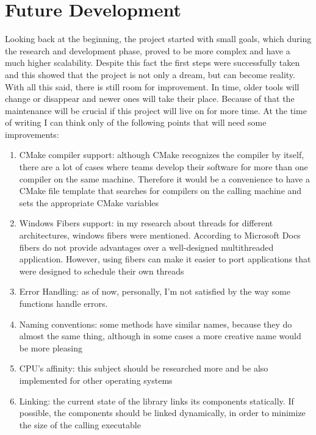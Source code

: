 \chapter{Future Development}
Looking back at the beginning, the project started with small goals, which during the research and development phase, proved to be more complex and have a much higher scalability. Despite this fact the first steps were successfully taken and this showed that the project is not only a dream, but can become reality. With all this said, there is still room for improvement. In time, older tools will change or disappear and newer ones will take their place. Because of that the maintenance will be crucial if this project will live on for more time. At the time of writing I can think only of the following points that will need some improvements:%
\begin{enumerate}
	\item CMake compiler support: although CMake recognizes the compiler by itself, there are a lot of cases where teams develop their software for more than one compiler on the same machine. Therefore it would be a convenience to have a CMake file template that searches for compilers on the calling machine and sets the appropriate CMake variables
	\item Windows Fibers support: in my research about threads for different architectures, windows fibers were mentioned. According to Microsoft Docs \dq fibers do not provide advantages over a well-designed multithreaded application. However, using fibers can make it easier to port applications that were designed to schedule their own threads\dq{}\cite{windows-fibers-doc}
	\item Error Handling: as of now, personally, I'm not satisfied by the way some functions handle errors. 
	\item Naming conventions: some methods have similar names, because they do almost the same thing, although in some cases a more creative name would be more pleasing
	\item CPU's affinity: this subject should be researched more and be also implemented for other operating systems
	\item Linking: the current state of the library links its components statically. If possible, the components should be linked dynamically, in order to minimize the size of the calling executable	
\end{enumerate}